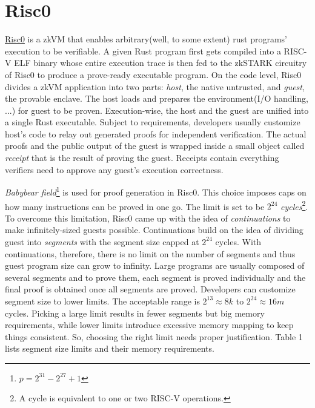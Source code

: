 \documentclass[a4paper, 10pt]{article}
\begin{document}
\section{Risc0}
\href{https://www.risczero.com}{Risc0} is a zkVM that enables arbitrary(well, to some extent) rust programs' execution to be verifiable. A given Rust program first gets compiled into a RISC-V ELF binary whose entire execution trace is then fed to the zkSTARK circuitry of Risc0 to produce a prove-ready executable program. On the code level, Risc0 divides a zkVM application into two parts: \textit{host}, the native untrusted, and \textit{guest}, the provable enclave. The host loads and prepares the environment(I/O handling, ...) for guest to be proven. Execution-wise, the host and the guest are unified into a single Rust executable. Subject to requirements, developers usually customize host's code to relay out generated proofs for independent verification. The actual proofs and the public output of the guest is wrapped inside a small object called \textit{receipt} that is the result of proving the guest. Receipts contain everything verifiers need to approve any guest's execution correctness. 
\par
\textit{Babybear field}\footnote{$p=2^{31}-2^{27}+1$} is used for proof generation in Risc0\cite{risczero:2022}. This choice imposes caps on how many instructions can be proved in one go. The limit is set to be $2^{24}$ \textit{cycles}\footnote{A cycle is equivalent to one or two RISC-V operations.}. To overcome this limitation, Risc0 came up with the idea of \textit{continuations} to make infinitely-sized guests possible. Continuations build on the idea of dividing guest into \textit{segments} with the segment size capped at $2^{24}$ cycles. With continuations, therefore, there is no limit on the number of segments and thus guest program size can grow to infinity. Large programs are usually composed of several segments and to prove them, each segment is proved individually and the final proof is obtained once all segments are proved. Developers can customize segment size to lower limits. The acceptable range is $2^{13}\approx 8k$ to $2^{24}\approx 16m$ cycles. Picking a large limit results in fewer segments but big memory requirements, while lower limits introduce excessive memory mapping to keep things consistent. So, choosing the right limit needs proper justification. Table 1 lists segment size limits and their memory requirements.
\end{document}
